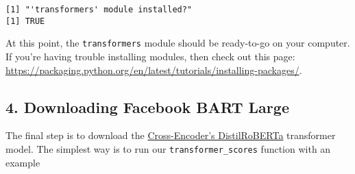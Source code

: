 \documentclass[
]{article}
\newenvironment{Shaded}{\begin{snugshade}}{\end{snugshade}}
\newcommand{\AttributeTok}[1]{\textcolor[rgb]{0.77,0.63,0.00}{#1}}
\newcommand{\CommentTok}[1]{\textcolor[rgb]{0.56,0.35,0.01}{\textit{#1}}}
\newcommand{\DecValTok}[1]{\textcolor[rgb]{0.00,0.00,0.81}{#1}}
\newcommand{\FunctionTok}[1]{\textcolor[rgb]{0.00,0.00,0.00}{#1}}
\newcommand{\NormalTok}[1]{#1}
\newcommand{\SpecialCharTok}[1]{\textcolor[rgb]{0.00,0.00,0.00}{#1}}
\newcommand{\StringTok}[1]{\textcolor[rgb]{0.31,0.60,0.02}{#1}}
\begin{document}
\begin{verbatim}
[1] "'transformers' module installed?"
[1] TRUE
\end{verbatim}

At this point, the \texttt{transformers} module should be ready-to-go on
your computer. If you're having trouble installing modules, then check
out this page:
\url{https://packaging.python.org/en/latest/tutorials/installing-packages/}.

\hypertarget{downloading-facebook-bart-large}{%
\subsection{4. Downloading Facebook BART
Large}\label{downloading-facebook-bart-large}}

The final step is to download the
\href{https://huggingface.co/cross-encoder/nli-distilroberta-base}{Cross-Encoder's DistilRoBERTa}
transformer model. The simplest way is to run our
\texttt{transformer\_scores} function with an example

\begin{Shaded}
\end{Shaded}
\end{document}
